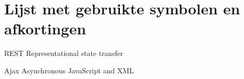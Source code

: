 \section*{Lijst met gebruikte symbolen en afkortingen}

\begin{abbreviations}
\item[REST] Representational state transfer
\item[Ajax] Asynchronous JavaScript and XML
\end{abbreviations}
